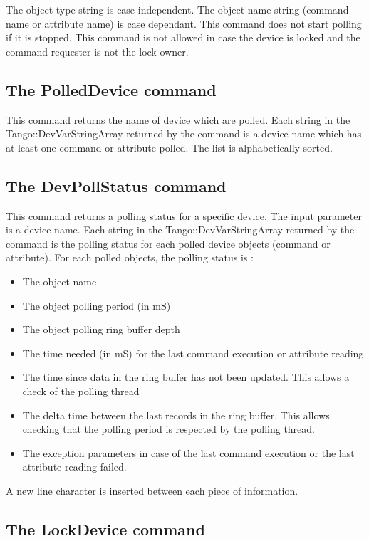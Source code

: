 \vspace{0.3cm}


The object type string is case independent. The object name string
(command name or attribute name) is case dependant. This command does
not start polling if it is stopped. This command is not allowed in
case the device is locked and the command requester is not the lock
owner.


\subsection{The PolledDevice command}

This command returns the name of device which are polled. Each string
in the Tango::DevVarStringArray returned by the command is a device
name which has at least one command or attribute polled. The list
is alphabetically sorted.


\subsection{The DevPollStatus command}

This command returns a polling status for a specific device. The input
parameter is a device name. Each string in the Tango::DevVarStringArray
returned by the command is the polling status for each polled device
objects (command or attribute). For each polled objects, the polling
status is :
\begin{itemize}
\item The object name
\item The object polling period (in mS)
\item The object polling ring buffer depth
\item The time needed (in mS) for the last command execution or attribute
reading
\item The time since data in the ring buffer has not been updated. This
allows a check of the polling thread
\item The delta time between the last records in the ring buffer. This allows
checking that the polling period is respected by the polling thread.
\item The exception parameters in case of the last command execution or
the last attribute reading failed.
\end{itemize}
A new line character is inserted between each piece of information.


\subsection{The LockDevice command}

